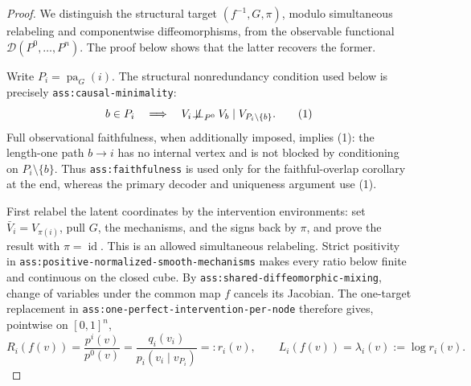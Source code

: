 \documentclass{article}
\begin{document}
\begin{proof}
We distinguish the structural target \((f^{-1},G,\pi)\), modulo simultaneous relabeling and componentwise diffeomorphisms, from the observable functional \(\mathscr D(P^0,\ldots,P^n)\).  The proof below shows that the latter recovers the former.

Write \(P_i=\operatorname{pa}_G(i)\).  The structural nonredundancy condition used below is precisely \texttt{ass:causal-minimality}:
\[
 b\in P_i\quad\Longrightarrow\quad
 V_i\mathbin{\not\!\perp\!\!\!\perp}_{P^0}V_b
 \mid V_{P_i\setminus\{b\}}.
\tag{1}
\]
Full observational faithfulness, when additionally imposed, implies (1): the length-one path \(b\to i\) has no internal vertex and is not blocked by conditioning on \(P_i\setminus\{b\}\).  Thus \texttt{ass:faithfulness} is used only for the faithful-overlap corollary at the end, whereas the primary decoder and uniqueness argument use (1).

First relabel the latent coordinates by the intervention environments: set \(\bar V_i=V_{\pi(i)}\), pull \(G\), the mechanisms, and the signs back by \(\pi\), and prove the result with \(\pi=\operatorname{id}\).  This is an allowed simultaneous relabeling.  Strict positivity in \texttt{ass:positive-normalized-smooth-mechanisms} makes every ratio below finite and continuous on the closed cube.  By \texttt{ass:shared-diffeomorphic-mixing}, change of variables under the common map \(f\) cancels its Jacobian.  The one-target replacement in \texttt{ass:one-perfect-intervention-per-node} therefore gives, pointwise on \([0,1]^n\),
\[
 R_i(f(v))=\frac{p^i(v)}{p^0(v)}
 =\frac{q_i(v_i)}{p_i(v_i\mid v_{P_i})}
 =:r_i(v),
 \qquad
 L_i(f(v))=\lambda_i(v):=\log r_i(v).
\tag{2}
\]


\end{proof}
\end{document}
